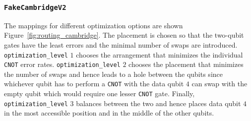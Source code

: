 \documentclass[11pt]{article}
\begin{document}
\subsubsection{\texttt{FakeCambridgeV2}}
The mappings for different optimization options are shown Figure~\ref{fig:routing_cambridge}. The placement is chosen so that the two-qubit gates have the least errors and the minimal number of swaps are introduced. \texttt{optimization\_level} $1$ chooses the arrangement that minimizes the individual \texttt{CNOT} error rates. \texttt{optimization\_level} $2$ chooses the placement that minimizes the number of swaps and hence leads to a hole between the qubits since whichever qubit has to perform a \texttt{CNOT} with the data qubit $4$ can swap with the empty qubit which would require one lesser \texttt{CNOT} gate. Finally, \texttt{optimization\_level} $3$ balances between the two and hence places data qubit $4$ in the most accessible position and in the middle of the other qubits.
\end{document}
